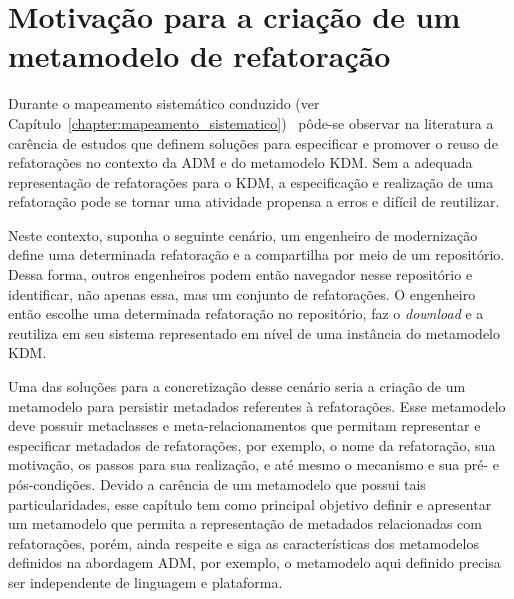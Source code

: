 \section{Motivação para a criação de um metamodelo de refatoração} %
\label{sec:motiva_o_para_a_cria_o_de_um_meta_modelo_de_refatora_o}

Durante o mapeamento sistemático conduzido (ver Capítulo~\ref{chapter:mapeamento_sistematico})~\cite{durelli_systematic_mapping} pôde-se observar na literatura a carência de estudos que definem soluções para especificar e promover o reuso de refatorações no contexto da ADM e do metamodelo KDM. Sem a adequada representação de refatorações para o KDM, a especificação e realização de uma refatoração pode se tornar uma atividade propensa a erros e difícil de reutilizar.

Neste contexto, suponha o seguinte cenário, um engenheiro de modernização define uma determinada refatoração e a compartilha por meio de um repositório. Dessa forma, outros engenheiros podem então navegador nesse repositório e identificar, não apenas essa, mas um conjunto de refatorações. O engenheiro então escolhe uma determinada refatoração no repositório, faz o \textit{download} e a reutiliza em seu sistema representado em nível de uma instância do metamodelo KDM. 

Uma das soluções para a concretização desse cenário seria a criação de um metamodelo para persistir metadados referentes à refatorações. Esse metamodelo deve possuir metaclasses e meta-relacionamentos que permitam representar e especificar metadados de refatorações, por exemplo, o nome da refatoração, sua motivação, os passos para sua realização, e até mesmo o mecanismo e sua pré- e pós-condições. Devido a carência de um metamodelo que possui tais particularidades, esse capítulo tem como principal objetivo definir e apresentar um metamodelo que permita a representação de metadados relacionadas com refatorações, porém, ainda respeite e siga as características dos metamodelos definidos na abordagem ADM, por exemplo, o metamodelo aqui definido precisa ser independente de linguagem e plataforma.

